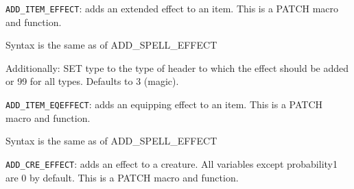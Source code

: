 \documentclass{article}
\begin{document}
\verb+ADD_ITEM_EFFECT+: adds an extended effect to an item.
This is a PATCH macro and function.
\begin{list}{}{}
\item Syntax is the same as of ADD_SPELL_EFFECT
\item Additionally: SET type to the type of header to which the effect should be added or 99 for all types. Defaults to 3 (magic).
\end{list}

\verb+ADD_ITEM_EQEFFECT+: adds an equipping effect to an item.
This is a PATCH macro and function.
\begin{list}{}{}
\item Syntax is the same as of ADD_SPELL_EFFECT
\end{list}

\verb+ADD_CRE_EFFECT+: adds an effect to a creature. All variables except probability1 are 0 by default.
This is a PATCH macro and function.
\end{document}
